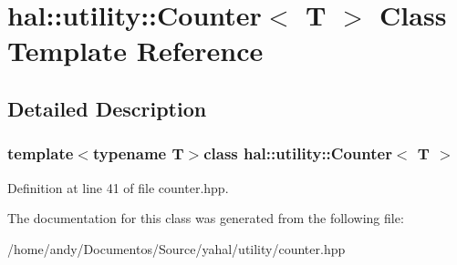 \hypertarget{classhal_1_1utility_1_1_counter}{}\section{hal\+:\+:utility\+:\+:Counter$<$ T $>$ Class Template Reference}
\label{classhal_1_1utility_1_1_counter}


\subsection{Detailed Description}
\subsubsection*{template$<$typename T$>$class hal\+::utility\+::\+Counter$<$ T $>$}



Definition at line 41 of file counter.\+hpp.



The documentation for this class was generated from the following file\+:\begin{DoxyCompactItemize}
\item 
/home/andy/\+Documentos/\+Source/yahal/utility/counter.\+hpp\end{DoxyCompactItemize}
